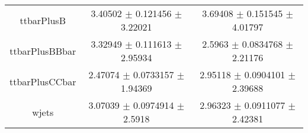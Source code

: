 \begin{table}
\begin{tabular}{ccc}
ttbarPlusB & \num{3.40502} $\pm$ \num{0.121456} $\pm$ \num{3.22021} & \num{3.69408} $\pm$ \num{0.151545} $\pm$ \num{4.01797}\\
ttbarPlusBBbar & \num{3.32949} $\pm$ \num{0.111613} $\pm$ \num{2.95934} & \num{2.5963} $\pm$ \num{0.0834768} $\pm$ \num{2.21176}\\
ttbarPlusCCbar & \num{2.47074} $\pm$ \num{0.0733157} $\pm$ \num{1.94369} & \num{2.95118} $\pm$ \num{0.0904101} $\pm$ \num{2.39688}\\
wjets & \num{3.07039} $\pm$ \num{0.0974914} $\pm$ \num{2.5918} & \num{2.96323} $\pm$ \num{0.0911077} $\pm$ \num{2.42381}\\
\bottomrule
\end{tabular}
\end{table}